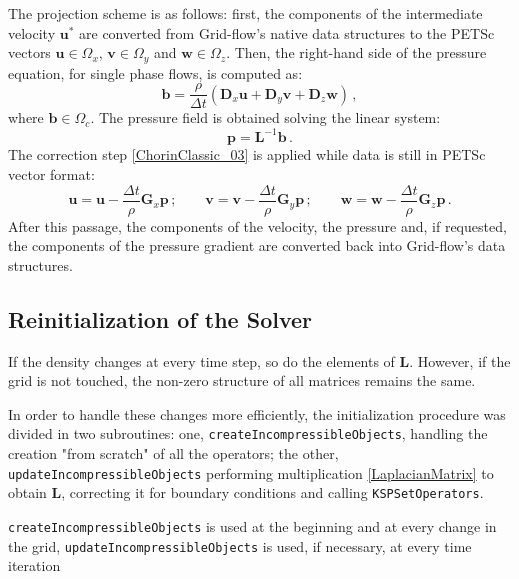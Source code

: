 \documentclass[11pt, a4paper, oneside, openany]{book}
\begin{document}
The projection scheme is as follows: first, the components of the intermediate velocity $\boldsymbol{u}^{*}$ are converted from Grid-flow's native data structures to the  PETSc vectors $\boldsymbol{u}\in\Omega_{x}$, $\boldsymbol{v}\in\Omega_{y}$ and $\boldsymbol{w}\in\Omega_{z}$. Then, the right-hand side of the pressure equation, for single phase flows, is computed as:
\begin{equation}
\boldsymbol{b}=\dfrac{\rho}{\Delta t}\left(\boldsymbol{D}_{x}\boldsymbol{u}+\boldsymbol{D}_{y}\boldsymbol{v}+\boldsymbol{D}_{z}\boldsymbol{w}\right)\,,\label{Right-Hand-Side}
\end{equation}
where $\boldsymbol{b}\in\Omega_{c}$. The pressure field is obtained solving the linear system:
\begin{equation}
\boldsymbol{p}=\boldsymbol{L}^{-1}\boldsymbol{b}\,.\label{PressureField}
\end{equation}
The correction step \eqref{ChorinClassic_03} is applied while data is still in PETSc vector format:
\begin{equation*}
\boldsymbol{u}=\boldsymbol{u}-\dfrac{\Delta t}{\rho}\boldsymbol{G}_{x}\boldsymbol{p}\,;\qquad\boldsymbol{v}=\boldsymbol{v}-\dfrac{\Delta t}{\rho}\boldsymbol{G}_{y}\boldsymbol{p}\,;\qquad\boldsymbol{w}=\boldsymbol{w}-\dfrac{\Delta t}{\rho}\boldsymbol{G}_{z}\boldsymbol{p}\,.
\end{equation*}
After this passage, the components of the velocity, the pressure and, if requested, the components of the pressure gradient are converted back into Grid-flow's data structures.
\subsection{Reinitialization of the Solver}\label{Subsection_Reinitialization_of_the_Solver}
If the density changes at every time step, so do the elements of $\boldsymbol{L}$. However, if the grid is not touched, the non-zero structure of all matrices remains the same.\par
In order to handle these changes more efficiently, the initialization procedure was divided in two subroutines: one, \texttt{\small createIncompressibleObjects}, handling the creation "from scratch" of all the operators; the other, \texttt{\small updateIncompressibleObjects} performing multiplication \eqref{LaplacianMatrix} to obtain $\boldsymbol{L}$, correcting it for boundary conditions and calling \texttt{\small KSPSetOperators}.\par
\texttt{\small createIncompressibleObjects} is used at the beginning and at every change in the grid, \texttt{\small updateIncompressibleObjects} is used, if necessary, at every time iteration
\end{document}
